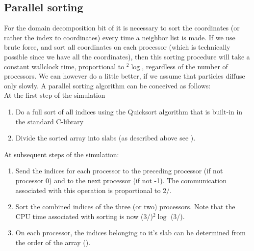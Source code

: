 \subsection{Parallel sorting}
\label{sec:parsort}
For the domain decomposition bit of {\gromacs} it is necessary to sort the 
coordinates (or rather the index to coordinates) every time a neighbor list is made.
If we use brute force, and sort all coordinates on each processor (which is 
technically possible since we have all the coordinates), then this sorting procedure
will take a constant wallclock time, proportional to {\natom}$^2\log${\natom}, 
regardless of the number of processors. We can however do a little
better, if we assume that particles diffuse only slowly.
A parallel sorting algorithm can be conceived as follows: \\
At the first step of the simulation
\begin{enumerate}
\item   Do a full sort of all indices using {\eg} the  Quicksort algorithm that is
        built-in in the standard C-library
\item   Divide the sorted array into slabs (as described above see 
        ).
\end{enumerate}
At subsequent steps of the simulation:
\begin{enumerate}
\item   Send the indices for each processor to the preceding processor (if
        not processor 0) and to the next processor (if not {\nproc}-1). The 
        communication associated with this operation is proportional to
        2{\natom}/{\nproc}.
\item   Sort the combined indices of the three (or two) processors. Note that
        the CPU time associated with sorting is now
        (3{\natom}/{\nproc})$^2\log$ (3{\natom}/{\nproc}).
\item   On each processor, the indices belonging to it's slab can be determined
        from the order of the array ().
\end{enumerate}





